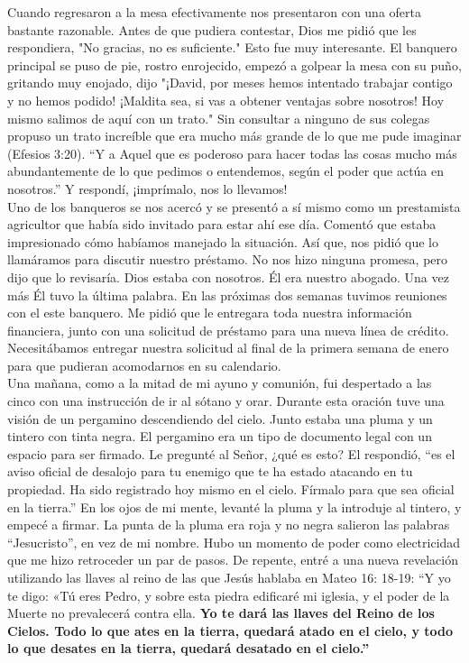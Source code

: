 \documentclass[twoside, 12pt]{book}
\begin{document}
Cuando regresaron a la mesa efectivamente nos presentaron con una oferta bastante razonable. Antes de que pudiera contestar, Dios me pidió que les respondiera, "No gracias, no es suficiente." Esto fue muy interesante. El banquero principal se puso de pie, rostro enrojecido, empezó a golpear la mesa con su puño, gritando muy enojado, dijo "¡David, por meses hemos intentado trabajar contigo y no hemos podido! ¡Maldita sea, si vas a obtener ventajas sobre nosotros! Hoy mismo salimos de aquí con un trato." Sin consultar a ninguno de sus colegas propuso un trato increíble que era mucho más grande de lo que me pude imaginar (Efesios 3:20). “Y a Aquel que es poderoso para hacer todas las cosas mucho más abundantemente de lo que pedimos o entendemos, según el poder que actúa en nosotros.” 
Y respondí, ¡imprímalo, nos lo llevamos!\\

Uno de los banqueros se nos acercó y se presentó a sí mismo como un prestamista agricultor que había sido invitado para estar ahí ese día. Comentó que estaba impresionado cómo habíamos manejado la situación. Así que, nos pidió que lo llamáramos para discutir nuestro préstamo. No nos hizo ninguna promesa, pero dijo que lo revisaría. Dios estaba con nosotros. Él era nuestro abogado. Una vez más Él tuvo la última palabra. En las próximas dos semanas tuvimos reuniones con el este banquero. Me pidió que le entregara toda nuestra información financiera, junto con una solicitud de préstamo para una nueva línea de crédito. Necesitábamos entregar nuestra solicitud al final de la primera semana de enero para que pudieran acomodarnos en su calendario.\\

Una mañana, como a la mitad de mi ayuno y comunión, fui despertado a las cinco con una instrucción de ir al sótano y orar. Durante esta oración tuve una visión de un pergamino descendiendo del cielo. Junto estaba una pluma y un tintero con tinta negra. El pergamino era un tipo de documento legal con un espacio para ser firmado. Le pregunté al Señor, ¿qué es esto? El respondió, “es el aviso oficial de desalojo para tu enemigo que te ha estado atacando en tu propiedad. Ha sido registrado hoy mismo en el cielo. Fírmalo para que sea oficial en la tierra.” En los ojos de mi mente, levanté la pluma y la introduje al tintero, y empecé a firmar. La punta de la pluma era roja y no negra salieron las palabras “Jesucristo”, en vez de mi nombre. Hubo un momento de poder como electricidad que me hizo retroceder un par de pasos. De repente, entré a una nueva revelación utilizando las llaves al reino de las que Jesús hablaba en Mateo 16: 18-19: “Y yo te digo: «Tú eres Pedro, y sobre esta piedra edificaré mi iglesia, y el poder de la Muerte no prevalecerá contra ella.  \textbf{Yo te dará las llaves del Reino de los Cielos. Todo lo que ates en la tierra, quedará atado en el cielo, y todo lo que desates en la tierra, quedará desatado en el cielo.”}\\
\end{document}
